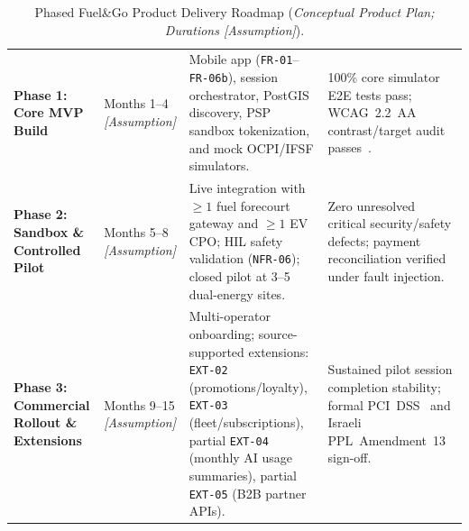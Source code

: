 \begin{table}[htbp]
  \centering
  \caption{Phased Fuel\&Go Product Delivery Roadmap (\emph{Conceptual Product Plan; Durations [Assumption]}).}
  \label{tab:product-roadmap}
  {\footnotesize
  \begin{tabularx}{\linewidth}{@{}P{24mm} P{22mm} P{54mm} L@{}}
    \toprule
     &  &  &  \\
    \midrule
    \textbf{Phase 1: Core MVP Build} & Months 1--4 \emph{[Assumption]} & Mobile app (\texttt{FR-01}--\texttt{FR-06b}), session orchestrator, PostGIS discovery, PSP sandbox tokenization, and mock OCPI/IFSF simulators. & 100\% core simulator E2E tests pass; WCAG~2.2~AA contrast/target audit passes~\cite{w3c2023wcag22}. \\
    \textbf{Phase 2: Sandbox \& Controlled Pilot} & Months 5--8 \emph{[Assumption]} & Live integration with $\ge 1$ fuel forecourt gateway and $\ge 1$ EV CPO; HIL safety validation (\texttt{NFR-06}); closed pilot at 3--5 dual-energy sites. & Zero unresolved critical security/safety defects; payment reconciliation verified under fault injection. \\
    \textbf{Phase 3: Commercial Rollout \& Extensions} & Months 9--15 \emph{[Assumption]} & Multi-operator onboarding; source-supported extensions: \texttt{EXT-02} (promotions/loyalty), \texttt{EXT-03} (fleet/subscriptions), partial \texttt{EXT-04} (monthly AI usage summaries), partial \texttt{EXT-05} (B2B partner APIs). & Sustained pilot session completion stability; formal PCI~DSS~\cite{pcissc2024pcidss401} and Israeli PPL~Amendment~13~\cite{israel1981ppl} sign-off. \\
    \bottomrule
  \end{tabularx}
  }
\end{table}

